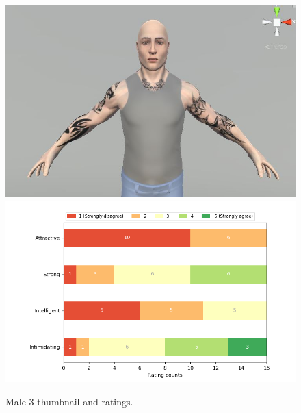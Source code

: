 \begin{figure}[H]
  \includegraphics[width=\linewidth]{Images/Males/3.JPG}
\endminipage\hfill
{}
  \includegraphics[width=\linewidth]{Survey/MRatings/avatar_m3.png}
\endminipage\hfill
\caption{Male 3 thumbnail and ratings.}
\end{figure}

